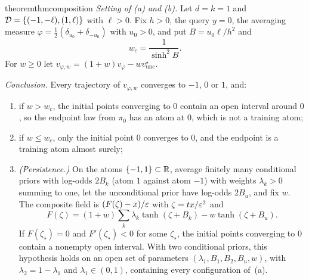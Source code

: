 \documentclass{article} %
\theoremstyle{plain}
\theoremstyle{definition}
\theoremstyle{remark}
\begin{document}
\begin{restatable}{theorem}{thmcomposition}
\label{thm:composition}
\emph{Setting of (a) and (b).} Let $d=k=1$ and $\mathcal{D}=\{(-1,-\ell),(1,\ell)\}$ with $\ell>0$. Fix
$h>0$, the query $y=0$, the averaging measure $\varphi=\tfrac12(\delta_{u_0}+\delta_{-u_0})$ with
$u_0>0$, and put $B=u_0\ell/h^2$ and
\begin{equation}
w_c=\frac1{\sinh^2B}.
\label{eq:wc}
\end{equation}
For $w\ge0$ let $v_{\varphi,w}=(1+w)v_\varphi-wv_{\mathrm{unc}}^\star$.

\emph{Conclusion.} Every trajectory of $v_{\varphi,w}$ converges to $-1$, $0$ or $1$, and:
\begin{enumerate}[label=(\alph*),leftmargin=2em]
\item if $w>w_c$, the initial points converging to $0$ contain an open interval around
  $0$, so the endpoint law from $\pi_0$ has an atom at $0$, which is not a training atom;
\item if $w\le w_c$, only the initial point $0$ converges to $0$, and the endpoint is a
  training atom almost surely;
\item \emph{(Persistence.)} On the atoms $\{-1,1\}\subset\mathbb{R}$, average finitely many conditional
  priors with log-odds $2B_k$ (atom $1$ against atom $-1$) with weights $\lambda_k>0$ summing to
  one, let the unconditional prior have log-odds $2B_u$, and fix $w$. The composite field is
  $(F(\zeta)-x)/\varepsilon$ with $\zeta=tx/\varepsilon^2$ and
  \begin{equation}
  F(\zeta)=(1+w)\sum_k\lambda_k\tanh(\zeta+B_k)-w\tanh(\zeta+B_u).
  \label{eq:composition-general}
  \end{equation}
  If $F(\zeta_\star)=0$ and $F'(\zeta_\star)<0$ for some $\zeta_\star$, the initial points
  converging to $0$ contain a nonempty open interval. With two conditional priors, this
  hypothesis holds on an open set of parameters $(\lambda_1,B_1,B_2,B_u,w)$, with
  $\lambda_2=1-\lambda_1$ and $\lambda_1\in(0,1)$, containing every configuration of~(a).
\end{enumerate}
\end{restatable}
\end{document}
